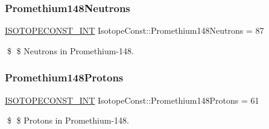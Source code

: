 \subsubsection{\texorpdfstring{Promethium148\+Neutrons}{Promethium148Neutrons}}
{\footnotesize\ttfamily \mbox{\hyperlink{group___isotope_const-_macros_ga5f18360b3e99483a35c32d789e62621c}{I\+S\+O\+T\+O\+P\+E\+C\+O\+N\+S\+T\+\_\+\+I\+NT}} Isotope\+Const\+::\+Promethium148\+Neutrons = 87}

\$ \$ Neutrons in Promethium-\/148. \mbox{\label{group___isotope_const-_promethium-_pm148_gafdae0b6c5ea46f1c8f90b9268c741582}} 
\subsubsection{\texorpdfstring{Promethium148\+Protons}{Promethium148Protons}}
{\footnotesize\ttfamily \mbox{\hyperlink{group___isotope_const-_macros_ga5f18360b3e99483a35c32d789e62621c}{I\+S\+O\+T\+O\+P\+E\+C\+O\+N\+S\+T\+\_\+\+I\+NT}} Isotope\+Const\+::\+Promethium148\+Protons = 61}

\$ \$ Protons in Promethium-\/148. 